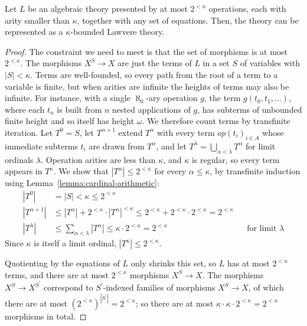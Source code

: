 \documentclass[acmsmall, screen, review, anonymous]{acmart}
\theoremstyle{definition}
\newcommand{\arr}{\rightarrow}
\begin{document}
\begin{lemma}
\label{lemma:term-count}
Let $L$ be an algebraic theory presented by at most $2^{<\kappa}$
operations, each with arity smaller than $\kappa$, together with any
set of equations. Then, the theory can be represented as a
$\kappa$-bounded Lawvere theory.
\end{lemma}
\begin{proof}
  The constraint we need to meet is that the set of morphisms is at most
  $2^{<\kappa}$. The morphisms $X^S \arr X$ are just the terms of $L$ in
  a set $S$ of variables with $|S| < \kappa$. Terms are well-founded, so
  every path from the root of a term to a variable is finite, but when
  arities are infinite the heights of terms may also be infinite. For
  instance, with a single $\aleph_0$-ary operation $g$, the term
  $g(t_0, t_1, \ldots)$, where each $t_n$ is built from $n$ nested
  applications of $g$, has subterms of unbounded finite height and so
  itself has height $\omega$. We therefore count terms by transfinite
  iteration. Let $T^{0} = S$, let $T^{\alpha+1}$ extend $T^{\alpha}$
  with every term $op(t_i)_{i \in A}$ whose immediate subterms $t_i$ are
  drawn from $T^{\alpha}$, and let
  $T^{\lambda} = \bigcup_{\alpha < \lambda} T^{\alpha}$ for limit
  ordinals $\lambda$. Operation arities are less than $\kappa$, and
  $\kappa$ is regular, so every term appears in $T^{\kappa}$. We show
  that $|T^{\alpha}| \le 2^{<\kappa}$ for every $\alpha \le \kappa$, by
  transfinite induction using Lemma~\ref{lemma:cardinal-arithmetic}:
  \begin{align*}
    |T^{0}| &= |S| < \kappa \le 2^{<\kappa} \\
    |T^{\alpha+1}| &\le |T^{\alpha}| + 2^{<\kappa} \cdot |T^{\alpha}|^{<\kappa}
      \le 2^{<\kappa} + 2^{<\kappa} \cdot 2^{<\kappa}
      = 2^{<\kappa} \\
    |T^{\lambda}| &\le \textstyle\sum_{\alpha < \lambda} |T^{\alpha}|
      \le \kappa \cdot 2^{<\kappa}
      = 2^{<\kappa}
      && \text{for limit $\lambda$}
  \end{align*}
  Since $\kappa$ is itself a limit ordinal,
  $|T^{\kappa}| \le 2^{<\kappa}$.

  Quotienting by the equations of $L$ only shrinks this set, so $L$ has
  at most $2^{<\kappa}$ terms, and there are at most $2^{<\kappa}$
  morphisms $X^S \arr X$. The morphisms $X^S \arr X^{S^\prime}$
  correspond to $S^\prime$-indexed families of morphisms $X^S \arr X$,
  of which there are at most $(2^{<\kappa})^{|S^\prime|} = 2^{<\kappa}$;
  so there are at most
  $\kappa \cdot \kappa \cdot 2^{<\kappa} = 2^{<\kappa}$ morphisms in
  total.
\end{proof}
\end{document}

